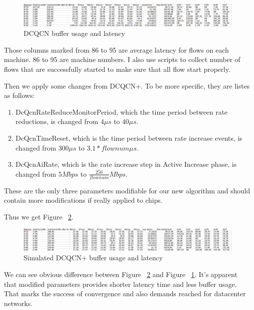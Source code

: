 \documentclass[12pt,a4paper]{article}
\begin{document}
\begin{figure}[ht]
	\begin{center}
		\includegraphics[width=6in]{default}
		\caption{DCQCN buffer usage and latency}
		\label{fig:default}
	\end{center}
\end{figure}

Those columns marked from 86 to 95 are average latency for flows on each machine.
86 to 95 are machine numbers.
I also use scripts to collect number of flows that are successfully started to make sure that all flow start properly.

Then we apply some changes from DCQCN+. To be more specific, they are listes as follows:
\begin{enumerate}
	\item DcQcnRateReduceMonitorPeriod, which the time period between rate reductions, is changed from $4\mu s$ to $40\mu s$.
	\item DcQcnTimeReset, which is the time period between rate increase events, is changed from $300\mu s$ to $3.1*flownum \mu s$.
	\item DcQcnAiRate, which is the rate increase step in Active Increase phase, is changed from $5Mbps$ to $\frac{256}{flownum} Mbps$.
\end{enumerate}
These are the only three parameters modifiable for our new algorithm and should contain more modifications if really applied to chips.

Thus we get Figure ~\ref{fig:improved}.

\begin{figure}[ht]
	\begin{center}
		\includegraphics[width=6in]{improved}
		\caption{Simulated DCQCN+ buffer usage and latency}
		\label{fig:improved}
	\end{center}
\end{figure}

We can see obvious difference between Figure ~\ref{fig:improved} and Figure ~\ref{fig:default}.
It's apparent that modified parameters provides shorter latency time and less buffer usage.
That marks the success of convergence and also demands reached for datacenter networks.
\end{document}
